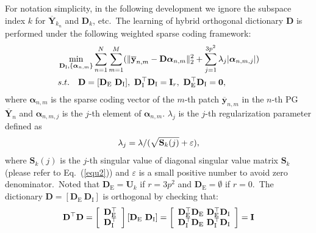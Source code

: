 \documentclass[10pt,twocolumn,letterpaper]{article}
\begin{document}
For notation simplicity, in the following development we ignore the subspace index $k$ for $\mathbf{\overline{Y}}_{k_{n}}$ and $\mathbf{D}_{k}$, etc.\ The learning of hybrid orthogonal dictionary $\mathbf{D}$ is performed under the following weighted sparse coding
framework:
\vspace{-2mm}
\begin{equation}\label{equ4}\vspace{-3mm}
\begin{split}
&\min_{\mathbf{D}_{\text{I}},\{\bm{\alpha}_{n,m}\}}
\sum_{n=1}^{N}\sum_{m=1}^{M}(\|\mathbf{\overline{y}}_{n,m}-\mathbf{D}\bm{\alpha}_{n,m}\|_{2}^{2}+\sum_{j=1}^{3p^{2}}\lambda_{j}|\bm{\alpha}_{n,m,j}|)
\\
&
s.t.
\quad
\mathbf{D}=[\mathbf{D}_{\text{E}}\ \mathbf{D}_{\text{I}}],\ \mathbf{D}_{\text{I}}^{\top}\mathbf{D}_{\text{I}} = \mathbf{I}_{r},\ \mathbf{D}_{\text{E}}^{\top}\mathbf{D}_{\text{I}} = \mathbf{0},
\end{split}
\end{equation}
where $\bm{\alpha}_{n,m}$ is the sparse coding vector of the $m$-th patch $\mathbf{\overline{y}}_{n,m}$ in the $n$-th PG $\mathbf{\overline{Y}}_{n}$ and $\bm{\alpha}_{n,m,j}$ is the $j$-th element of $\bm{\alpha}_{n,m}$. $\lambda_{j}$ is the $j$-th regularization parameter defined as
\vspace{-1mm}
\begin{equation}\label{equ5}\vspace{-1mm}
\lambda_{j} = \lambda/(\sqrt{\mathbf{S}_{k}(j)}+\varepsilon),
\end{equation}
where $\mathbf{S}_{k}(j)$ is the $j$-th singular value of diagonal singular value matrix $\mathbf{S}_{k}$ (please refer to Eq.\ (\ref{equ2})) and $\varepsilon$ is a small positive number to avoid zero denominator.\ Noted that $\mathbf{D}_{\text{E}}=\mathbf{U}_{k}$ if $r=3p^{2}$ and $\mathbf{D}_{\text{E}}=\emptyset$ if $r=0$.\ The dictionary $\mathbf{D} = [\mathbf{D}_{\text{E}}\ \mathbf{D}_{\text{I}}]$ is orthogonal by checking that:
\vspace{-2mm}
\begin{equation}\label{equ6}\vspace{-1mm}
\mathbf{D}^{\top}\mathbf{D} = 
\left[\begin{array}{c}
\mathbf{D}_{\text{E}}^{\top}
\\
\mathbf{D}_{\text{I}}^{\top}
\end{array}\right]
[\mathbf{D}_{\text{E}}\ \mathbf{D}_{\text{I}}]
=
\left[\begin{array}{cc}
\mathbf{D}_{\text{E}}^{\top}\mathbf{D}_{\text{E}}\ \mathbf{D}_{\text{E}}^{\top}\mathbf{D}_{\text{I}}
\\
\mathbf{D}_{\text{I}}^{\top}\mathbf{D}_{\text{E}}\ \mathbf{D}_{\text{I}}^{\top}\mathbf{D}_{\text{I}}
\end{array}\right]
=
\mathbf{I}
\end{equation}
\end{document}
